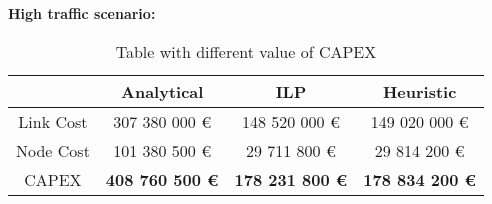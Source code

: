 \vspace{11pt}
\textbf{High traffic scenario:}\\

\begin{table}[h!]
\centering
\begin{tabular}{| c | c | c | c |}
 \hline
   & Analytical & ILP & Heuristic \\
 \hline\hline
 Link Cost & 307 380 000 \euro & 148 520 000 \euro & 149 020 000 \euro \\
 Node Cost & 101 380 500 \euro & 29 711 800 \euro & 29 814 200 \euro \\
 CAPEX & \textbf{408 760 500 \euro} & \textbf{178 231 800 \euro} & \textbf{178 834 200 \euro} \\
 \hline
\end{tabular}
\caption{Table with different value of CAPEX }
\label{table_comparative_opaque_sur_ref_3}
\end{table}

